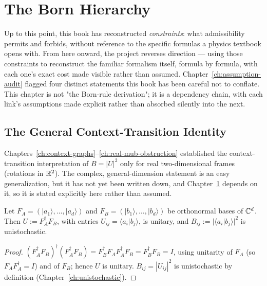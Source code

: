 \chapter{The Born Hierarchy}
\label{ch:born-rule}

Up to this point, this book has reconstructed \emph{constraints}: what
admissibility permits and forbids, without reference to the specific
formulas a physics textbook opens with. From here onward, the project
reverses direction — using those constraints to reconstruct the familiar
formalism itself, formula by formula, with each one's exact cost made
visible rather than assumed. Chapter~\ref{ch:assumption-audit} flagged four distinct statements this book
has been careful not to conflate. This chapter is not "the Born-rule
derivation"; it is a dependency chain, with each link's assumptions made
explicit rather than absorbed silently into the next.

\section{The General Context-Transition Identity}

Chapters~\ref{ch:context-graphs}--\ref{ch:real-mub-obstruction} established
the context-transition interpretation of $B=|U|^2$ only for real
two-dimensional frames (rotations in $\mathbb{R}^2$). The complex, general-dimension
statement is an easy generalization, but it has not yet been written down,
and Chapter~\ref{ch:born-rule} depends on it, so it is stated explicitly here
rather than assumed.

\begin{proposition}
\label{prop:general-context-transition}
Let $F_A = (|a_1\rangle,\dots,|a_d\rangle)$ and $F_B =
(|b_1\rangle,\dots,|b_d\rangle)$ be orthonormal bases of $\mathbb{C}^d$. Then $U :=
F_A^\dagger F_B$, with entries $U_{ij} = \langle a_i|b_j\rangle$, is unitary,
and $B_{ij} := |\langle a_i|b_j\rangle|^2$ is unistochastic.
\end{proposition}

\begin{proof}
$(F_A^\dagger F_B)^\dagger(F_A^\dagger F_B) = F_B^\dagger F_A F_A^\dagger F_B
= F_B^\dagger F_B = I$, using unitarity of $F_A$ (so $F_AF_A^\dagger=I$) and
of $F_B$; hence $U$ is unitary. $B_{ij}=|U_{ij}|^2$ is unistochastic by
definition (Chapter~\ref{ch:unistochastic}).
\end{proof}

